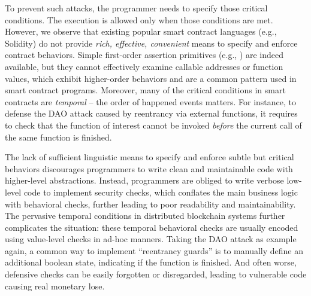 

To prevent such attacks, the programmer needs to specify those critical
conditions. The execution is allowed only when those conditions are met.
However, we observe that existing popular smart contract languages (e.g.,
Solidity) do not provide \emph{rich, effective, convenient} means to specify
and enforce contract behaviors.
Simple first-order assertion primitives (e.g., ) are indeed available,
but they cannot effectively examine callable addresses or function values, which
exhibit higher-order behaviors and are a common pattern used in smart contract programs.
Moreover, many of the critical conditions in smart contracts are \emph{temporal}
-- the order of happened events matters.
For instance, to defense the DAO attack caused by reentrancy via
external functions, it requires to check that the function of interest cannot
be invoked \emph{before} the current call of the same function is finished.


The lack of sufficient linguistic means to specify and enforce subtle but
critical behaviors discourages programmers to write clean and maintainable
code with higher-level abstractions.
Instead, programmers are obliged to write verbose low-level code
to implement security checks, which conflates the main business logic with
behavioral checks, further leading to poor readability and maintainability.
The pervasive temporal conditions in distributed blockchain systems further
complicates the situation: these temporal behavioral checks are usually
encoded using value-level checks in ad-hoc manners.
Taking the DAO attack as example again, a common way to implement ``reentrancy
guards'' is to manually define an additional boolean state, indicating
if the function is finished.
And often worse, defensive checks can be easily forgotten or disregarded,
leading to vulnerable code causing real monetary lose.


